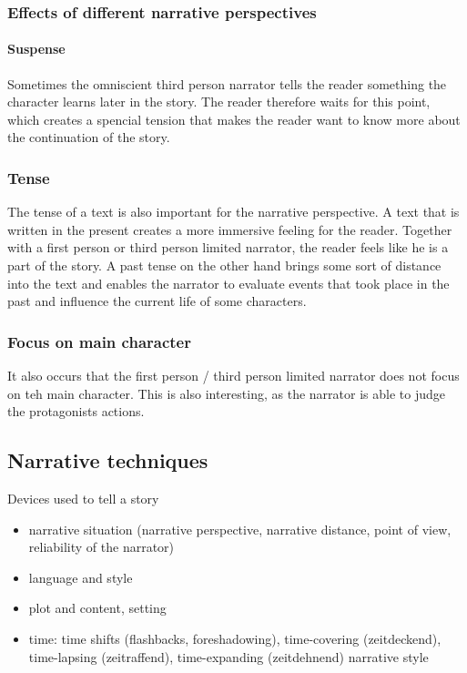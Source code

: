 \documentclass{article}
\begin{document}
	\subsubsection{Effects of different narrative perspectives}

	\paragraph{Suspense}
	Sometimes the omniscient third person narrator tells the reader something the character learns later in the story. The reader therefore waits for this point, which creates a spencial tension that makes the reader want to know more about the continuation of the story.

	\subsubsection{Tense}
	The tense of a text is also important for the narrative perspective. A text that is written in the present creates a more immersive feeling for the reader. Together with a first person or third person limited narrator, the reader feels like he is a part of the story.
	A past tense on the other hand brings some sort of distance into the text and enables the narrator to evaluate events that took place in the past and influence the current life of some characters.

	\subsubsection{Focus on main character}
	It also occurs that the first person / third person limited narrator does not focus on teh main character. This is also interesting, as the narrator is able to judge the protagonists actions.

	\subsection{Narrative techniques}
	Devices used to tell a story

	\begin{itemize}
		\item narrative situation (narrative perspective, narrative distance, point of view, reliability of the narrator)
		\item language and style
		\item plot and content, setting
		\item time: time shifts (flashbacks, foreshadowing), time-covering (zeitdeckend), time-lapsing (zeitraffend), time-expanding (zeitdehnend) narrative style
	\end{itemize}
\end{document}
